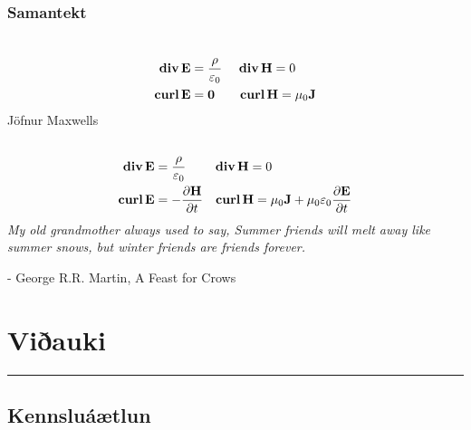 \documentclass[a4paper,10pt,icelandic]{sphinxmanual}
\begin{document}
\subsection{Samantekt}
\label{Kafli6:samantekt}\begin{gather}
\begin{split}\displaystyle\end{split}\notag\\\begin{split}\begin{aligned}
  \mbox{${\rm\bf div\,}$}\mbox{${\bf E}$}&= \frac{\rho}{\varepsilon_0} \quad~ \mbox{${\rm\bf div\,}$}\mbox{${\bf H}$}= 0 \\
  \mbox{${\rm\bf curl\,}$}\mbox{${\bf E}$}&= \mathbf{0} \qquad \mbox{${\rm\bf curl\,}$}\mbox{${\bf H}$}= \mu_0 \mathbf{J}
 \end{aligned}\end{split}\notag
\end{gather}
Jöfnur Maxwells
\begin{gather}
\begin{split}\displaystyle\end{split}\notag\\\begin{split}\begin{aligned}
  \mbox{${\rm\bf div\,}$}\mbox{${\bf E}$}&= \frac{\rho}{\varepsilon_0} \qquad ~ \mbox{${\rm\bf div\,}$}\mbox{${\bf H}$}= 0 \\
  \mbox{${\rm\bf curl\,}$}\mbox{${\bf E}$}&= -\frac{\partial \mbox{${\bf H}$}}{\partial t} \quad \mbox{${\rm\bf curl\,}$}\mbox{${\bf H}$}= \mu_0 \mathbf{J} + \mu_0 \varepsilon_0  \frac{\partial\mbox{${\bf E}$}}{\partial t}
 \end{aligned}\end{split}\notag
\end{gather}
\emph{My old grandmother always used to say, Summer friends will melt away like summer snows, but winter friends are friends forever.}

- George R.R. Martin, A Feast for Crows


\chapter{Viðauki}
\label{vidauki::doc}\label{vidauki:viauki}

\bigskip\hrule{}\bigskip



\section{Kennsluáætlun}
\label{vidauki:kennsluaaetlun}
\end{document}
